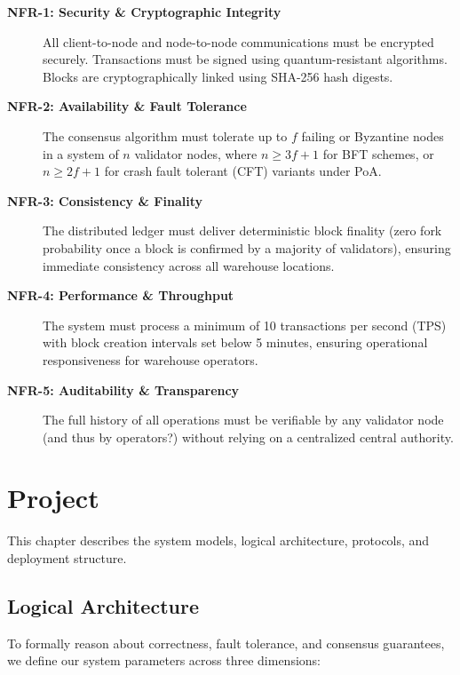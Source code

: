 \documentclass[11pt,a4paper]{memoir}
\begin{document}
\begin{description}
    \item[\textbf{NFR-1: Security \& Cryptographic Integrity}]
    All client-to-node and node-to-node communications must be encrypted securely. Transactions must be signed using quantum-resistant algorithms. Blocks are cryptographically linked using SHA-256 hash digests.

    \item[\textbf{NFR-2: Availability \& Fault Tolerance}]
    The consensus algorithm must tolerate up to $f$ failing or Byzantine nodes in a system of $n$ validator nodes, where $n \ge 3f + 1$ for BFT schemes, or $n \ge 2f + 1$ for crash fault tolerant (CFT) variants under PoA.

    \item[\textbf{NFR-3: Consistency \& Finality}]
    The distributed ledger must deliver deterministic block finality (zero fork probability once a block is confirmed by a majority of validators), ensuring immediate consistency across all warehouse locations.

    \item[\textbf{NFR-4: Performance \& Throughput}]
    The system must process a minimum of 10 transactions per second (TPS) with block creation intervals set below 5 minutes, ensuring operational responsiveness for warehouse operators.

    \item[\textbf{NFR-5: Auditability \& Transparency}]
    The full history of all operations must be verifiable by any validator node (and thus by operators?) without relying on a centralized central authority.
\end{description}

\chapter{Project}\label{ch:project}

This chapter describes the system models, logical architecture, protocols, and deployment structure.

\section{Logical Architecture}
To formally reason about correctness, fault tolerance, and consensus guarantees, we define our system parameters across three dimensions:
\end{document}
